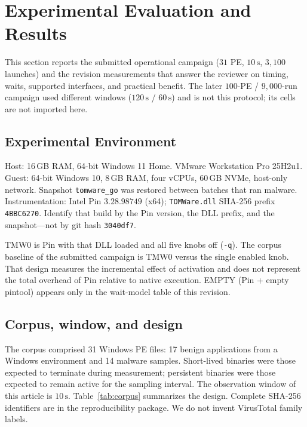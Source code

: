 \documentclass[pdflatex,sn-mathphys-num]{sn-jnl}
\theoremstyle{thmstyleone}
\theoremstyle{thmstyletwo}
\theoremstyle{thmstylethree}
\begin{document}
\section{Experimental Evaluation and Results}
\label{sec:experimental_evaluation}

This section reports the submitted operational campaign ($31$ PE, $10\,\mathrm{s}$, $3{,}100$ launches) and the revision measurements that answer the reviewer on timing, waits, supported interfaces, and practical benefit. The later $100$-PE / $9{,}000$-run campaign used different windows ($120\,\mathrm{s}$ / $60\,\mathrm{s}$) and is not this protocol; its cells are not imported here.

\subsection{Experimental Environment}
\label{subsec:environment}

Host: 16\,GB RAM, 64-bit Windows 11 Home. VMware Workstation Pro 25H2u1. Guest: 64-bit Windows 10, 8\,GB RAM, four vCPUs, 60\,GB NVMe, host-only network. Snapshot \texttt{tomware\_go} was restored between batches that ran malware. Instrumentation: Intel Pin $3.28.98749$ (x64); \texttt{TOMWare.dll} SHA-256 prefix \texttt{4BBC6270}. Identify that build by the Pin version, the DLL prefix, and the snapshot---not by git hash \texttt{3040df7}.

TMW0 is Pin with that DLL loaded and all five knobs off (\texttt{-q}). The corpus baseline of the submitted campaign is TMW0 versus the single enabled knob. That design measures the incremental effect of activation and does not represent the total overhead of Pin relative to native execution. EMPTY (Pin + empty pintool) appears only in the wait-model table of this revision.

\subsection{Corpus, window, and design}
\label{subsec:corpus}

The corpus comprised 31 Windows PE files: 17 benign applications from a Windows environment and 14 malware samples. Short-lived binaries were those expected to terminate during measurement; persistent binaries were those expected to remain active for the sampling interval. The observation window of this article is $10\,\mathrm{s}$. Table~\ref{tab:corpus} summarizes the design. Complete SHA-256 identifiers are in the reproducibility package. We do not invent VirusTotal family labels.
\end{document}
